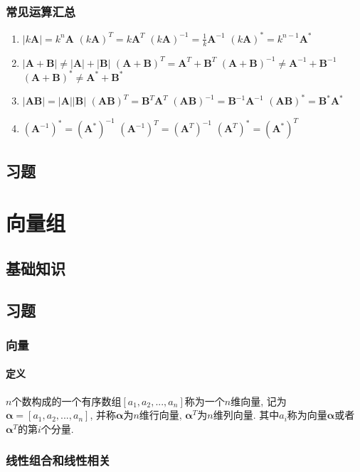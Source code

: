 \subsection{常见运算汇总}
\begin{enumerate}
\item 
\subitem $ |k\bm{A}|=k^{n}\bm{A} $
\subitem $ (k\bm{A})^{T}=k\bm{A}^{T} $
\subitem $ (k\bm{A})^{-1}=\frac{1}{k}\bm{A}^{-1} $
\subitem $ (k\bm{A})^{*}=k^{n-1}\bm{A}^{*} $
\item 
\subitem $ |\bm{A}+\bm{B}|\neq |\bm{A}|+|\bm{B}| $
\subitem $ (\bm{A}+\bm{B})^{T}=\bm{A}^{T}+\bm{B}^{T} $
\subitem $ (\bm{A}+\bm{B})^{-1}\neq \bm{A}^{-1}+\bm{B}^{-1} $
\subitem $ (\bm{A}+\bm{B})^{*}\neq \bm{A}^{*}+\bm{B}^{*} $
\item 
\subitem $ |\bm{A}\bm{B}|=|\bm{A}||\bm{B}| $
\subitem $ (\bm{A}\bm{B})^{T}=\bm{B}^{T}\bm{A}^{T} $
\subitem $ (\bm{A}\bm{B})^{-1}=\bm{B}^{-1}\bm{A}^{-1} $
\subitem $ (\bm{A}\bm{B})^{*}=\bm{B}^{*}\bm{A}^{*} $
\item 
\subitem $ (\bm{A}^{-1})^{*}=(\bm{A}^{*})^{-1} $
\subitem $ (\bm{A}^{-1})^{T}=(\bm{A}^{T})^{-1} $
\subitem $ (\bm{A}^{T})^{*}=(\bm{A}^{*})^{T} $
\end{enumerate}
\section{习题}
\chapter{向量组}
\section{基础知识}
\section{习题}
\subsection{向量}
\subsubsection{定义}
$ n $个数构成的一个有序数组$ [a_{1},a_{2},...,a_{n}] $称为一个$ n $维向量, 记为$ \bm{\alpha} = [a_{1},a_{2},...,a_{n}] $, 并称$ \bm{\alpha} $为$ n $维行向量, $ \bm{\alpha}^{T} $为$ n $维列向量. 其中$ a_{i} $称为向量$ \bm{\alpha} $或者$ \bm{\alpha}^{T} $的第$ i $个分量.
\subsection{线性组合和线性相关}
